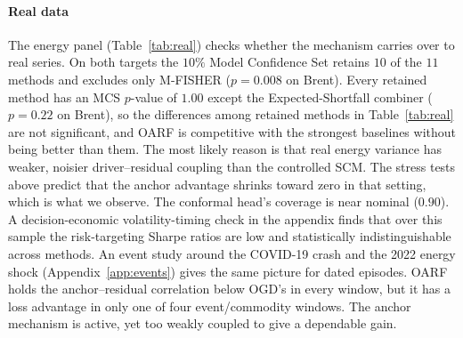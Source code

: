 \documentclass[authoryear,preprint,12pt]{elsarticle}
\theoremstyle{plain}
\theoremstyle{remark}
\newcommand{\OARF}{\textsc{OARF}}
\begin{document}
\paragraph{Real data}
The energy panel (Table~\ref{tab:real}) checks whether the mechanism carries over to real series. On both targets the $10\%$ Model Confidence Set retains $10$ of the $11$ methods and excludes only M-FISHER ($p=0.008$ on Brent). Every retained method has an MCS $p$-value of $1.00$ except the Expected-Shortfall combiner ($p=0.22$ on Brent), so the differences among retained methods in Table~\ref{tab:real} are not significant, and \OARF{} is competitive with the strongest baselines without being better than them. The most likely reason is that real energy
variance has weaker, noisier driver--residual coupling than the controlled SCM. The
stress tests above predict that the anchor advantage shrinks toward zero in that
setting, which is what we observe. The conformal head's
coverage is near nominal ($0.90$). A decision-economic volatility-timing check in the appendix finds that over this sample the risk-targeting Sharpe ratios are low and
statistically indistinguishable across methods.
An event study around the COVID-19 crash and the 2022 energy shock
(Appendix~\ref{app:events}) gives the same picture for dated episodes. \OARF{} holds
the anchor--residual correlation below OGD's in every window, but it has a loss
advantage in only one of four event/commodity windows. The anchor mechanism is active,
yet too weakly coupled to give a dependable gain.
\end{document}
